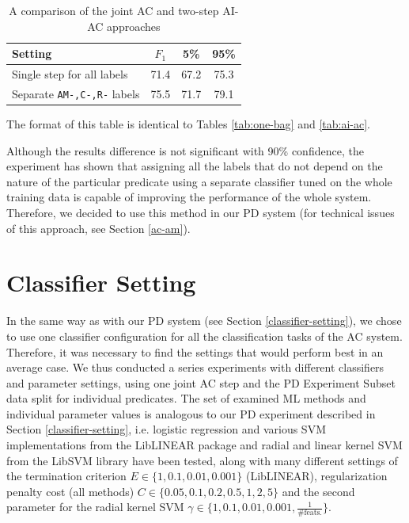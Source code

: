 \documentclass[12pt,notitlepage]{report}
\begin{document}
\begin{table}[htb]\label{tab:separate-ams}
\caption{A comparison of the joint AC and two-step AI-AC approaches}\footnotesize
\begin{center}
\begin{tabular}{|l|c|c|c|}\hline
\bf Setting & $F_1$ & \bf 5\% & \bf 95\% \\\hline
Single step for all labels & 71.4 & 67.2 & 75.3 \\
Separate \texttt{AM-,C-,R-} labels & 75.5 & 71.7 & 79.1 \\\hline
\end{tabular}
\end{center}
The format of this table is identical to Tables \ref{tab:one-bag} and \ref{tab:ai-ac}.
\end{table}

Although the results difference is not significant with 90\% confidence, the experiment has shown that assigning all the labels that do not depend on the nature of the particular predicate using a separate classifier tuned on the whole training data is capable of improving the performance of the whole system. Therefore, we decided to use this method in our PD system (for technical issues of this approach, see Section \ref{ac-am}). 

\section{Classifier Setting}\label{ac-setting}

In the same way as with our PD system (see Section \ref{classifier-setting}), we chose to use one classifier configuration for all the classification tasks of the AC system. Therefore, it was necessary to find the settings that would perform best in an average case. We thus conducted a series experiments with different classifiers and parameter settings, using one joint AC step and the PD Experiment Subset data split for individual predicates. The set of examined ML methods and individual parameter values is analogous to our PD experiment described in Section \ref{classifier-setting}, i.e. logistic regression and various SVM implementations from the LibLINEAR package and radial and linear kernel SVM from the LibSVM library have been tested, along with many different settings of the termination criterion $E\in\{1,0.1,0.01,0.001\}$ (LibLINEAR), regularization penalty cost (all methods) $C\in\{0.05,0.1,0.2,0.5,1,2,5\}$ and the second parameter for the radial kernel SVM $\gamma\in\{1,0.1,0.01,0.001,\frac{1}{\mbox{\# feats.}}\}$. 
\end{document}
